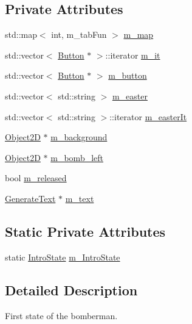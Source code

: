 \subsection*{Private Attributes}
\begin{DoxyCompactItemize}
\item 
std\+::map$<$ int, m\+\_\+tab\+Fun $>$ \hyperlink{class_intro_state_a4c23780e73716669d319929e8906c598}{m\+\_\+map}
\item 
std\+::vector$<$ \hyperlink{class_button}{Button} $\ast$ $>$\+::iterator \hyperlink{class_intro_state_aff5068e91ae89f0c123dcfb3b269f5c7}{m\+\_\+it}
\item 
std\+::vector$<$ \hyperlink{class_button}{Button} $\ast$ $>$ \hyperlink{class_intro_state_a0b10257f3ddc662e0476bfd30def50e4}{m\+\_\+button}
\item 
std\+::vector$<$ std\+::string $>$ \hyperlink{class_intro_state_a9b6a7c6121418d2659ec79f600385b8f}{m\+\_\+easter}
\item 
std\+::vector$<$ std\+::string $>$\+::iterator \hyperlink{class_intro_state_a9a4157cf8aa4a5ce48b782b7f4a33af9}{m\+\_\+easter\+It}
\item 
\hyperlink{class_object2_d}{Object2\+D} $\ast$ \hyperlink{class_intro_state_ad64626c0d7654481449fec2f1d07c7ed}{m\+\_\+background}
\item 
\hyperlink{class_object2_d}{Object2\+D} $\ast$ \hyperlink{class_intro_state_abf443c0163efe764d7f8961e2816b73d}{m\+\_\+bomb\+\_\+left}
\item 
bool \hyperlink{class_intro_state_a746908a39dc856517869254b7d0a4114}{m\+\_\+released}
\item 
\hyperlink{class_generate_text}{Generate\+Text} $\ast$ \hyperlink{class_intro_state_ae3f313128aee34075d81f0a0faee7470}{m\+\_\+text}
\end{DoxyCompactItemize}
\subsection*{Static Private Attributes}
\begin{DoxyCompactItemize}
\item 
static \hyperlink{class_intro_state}{Intro\+State} \hyperlink{class_intro_state_a43ad1f560360ce4e465b059697193aa5}{m\+\_\+\+Intro\+State}
\end{DoxyCompactItemize}


\subsection{Detailed Description}
First state of the bomberman. 

